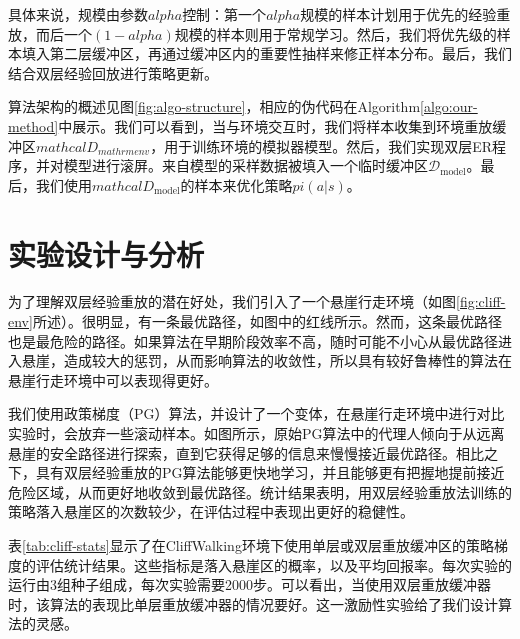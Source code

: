 

具体来说，规模由参数$alpha$控制：第一个$alpha$规模的样本计划用于优先的经验重放，而后一个$(1-alpha)$规模的样本则用于常规学习。然后，我们将优先级的样本填入第二层缓冲区，再通过缓冲区内的重要性抽样来修正样本分布。最后，我们结合双层经验回放进行策略更新。

算法架构的概述见图\ref{fig:algo-structure}，相应的伪代码在Algorithm\ref{algo:our-method}中展示。我们可以看到，当与环境交互时，我们将样本收集到环境重放缓冲区$mathcal{D}_{mathrm{env}}$，用于训练环境的模拟器模型。然后，我们实现双层ER程序，并对模型进行滚屏。来自模型的采样数据被填入一个临时缓冲区$\mathcal{D}_\mathrm{model}$。最后，我们使用$mathcal{D}_\mathrm{model}$的样本来优化策略$pi(a|s)$。

\section{实验设计与分析}

为了理解双层经验重放的潜在好处，我们引入了一个悬崖行走环境（如图\ref{fig:cliff-env}所述）。很明显，有一条最优路径，如图中的红线所示。然而，这条最优路径也是最危险的路径。如果算法在早期阶段效率不高，随时可能不小心从最优路径进入悬崖，造成较大的惩罚，从而影响算法的收敛性，所以具有较好鲁棒性的算法在悬崖行走环境中可以表现得更好。

我们使用政策梯度（PG）算法，并设计了一个变体，在悬崖行走环境中进行对比实验时，会放弃一些滚动样本。如图所示，原始PG算法中的代理人倾向于从远离悬崖的安全路径进行探索，直到它获得足够的信息来慢慢接近最优路径。相比之下，具有双层经验重放的PG算法能够更快地学习，并且能够更有把握地提前接近危险区域，从而更好地收敛到最优路径。统计结果表明，用双层经验重放法训练的策略落入悬崖区的次数较少，在评估过程中表现出更好的稳健性。

表\ref{tab:cliff-stats}显示了在CliffWalking环境下使用单层或双层重放缓冲区的策略梯度的评估统计结果。这些指标是落入悬崖区的概率，以及平均回报率。每次实验的运行由3组种子组成，每次实验需要2000步。可以看出，当使用双层重放缓冲器时，该算法的表现比单层重放缓冲器的情况要好。这一激励性实验给了我们设计算法的灵感。